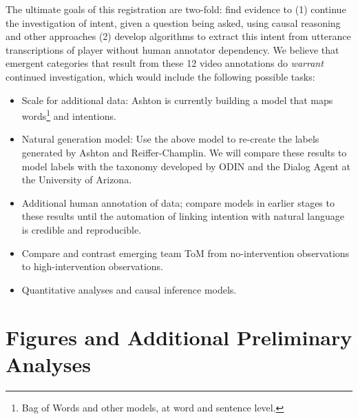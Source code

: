 The ultimate goals of this registration are two-fold: find evidence to (1) continue the investigation of intent, given a question being asked, using causal reasoning and other approaches (2) develop algorithms to extract this intent from utterance transcriptions of player without human annotator dependency. We believe that emergent categories that result from these 12 video annotations do \emph{warrant} continued investigation, which would include the following possible tasks:
\begin{itemize}
    \item Scale for additional data: Ashton is currently building a model that maps words\footnote{Bag of Words and other models, at word and sentence level.} and intentions.
    \item Natural generation model: Use the above model to re-create the labels generated by Ashton and Reiffer-Champlin. We will compare these results to model labels with the taxonomy developed by ODIN and the Dialog Agent at the University of Arizona.
    \item Additional human annotation of data; compare models in earlier stages to these results until the automation of linking intention with natural language is credible and reproducible.
    \item Compare and contrast emerging team ToM from no-intervention observations to high-intervention observations.
    \item Quantitative analyses and causal inference models.
\end{itemize}



\section{Figures and Additional Preliminary Analyses}

